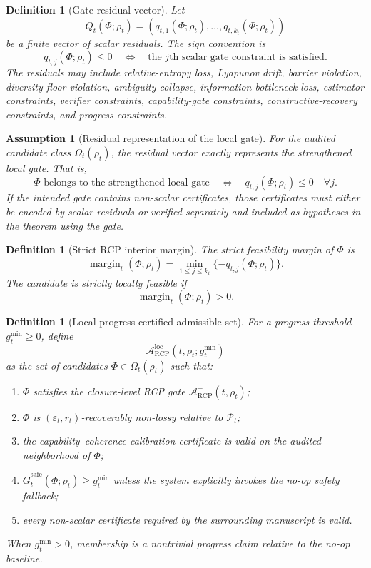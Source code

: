 \documentclass[11pt]{article}
\newtheorem{definition}[theorem]{Definition}
\newtheorem{assumption}[theorem]{Assumption}
\newcommand{\Acal}{\mathcal{A}}
\newcommand{\Pcal}{\mathcal{P}}
\newcommand{\1}{\mathbf{1}}
\newcommand{\eps}{\varepsilon}
\newcommand{\RCP}{\mathrm{RCP}}
\newcommand{\safe}{\mathrm{safe}}
\newcommand{\margin}{\operatorname{margin}}
\begin{document}
\begin{definition}[Gate residual vector]
Let
\[
Q_t(\Phi;\rho_t)=(q_{t,1}(\Phi;\rho_t),\dots,q_{t,k_t}(\Phi;\rho_t))
\]
be a finite vector of scalar residuals.  The sign convention is
\[
q_{t,j}(\Phi;\rho_t)\le0
\quad\Longleftrightarrow\quad
\text{the }j\text{th scalar gate constraint is satisfied.}
\]
The residuals may include relative-entropy loss, Lyapunov drift, barrier violation, diversity-floor violation, ambiguity collapse, information-bottleneck loss, estimator constraints, verifier constraints, capability-gate constraints, constructive-recovery constraints, and progress constraints.
\end{definition}

\begin{assumption}[Residual representation of the local gate]
\label{ass:residual_representation_gate}
For the audited candidate class \(\Omega_t(\rho_t)\), the residual vector exactly represents the strengthened local gate.  That is,
\[
\Phi\text{ belongs to the strengthened local gate}
\quad\Longleftrightarrow\quad
q_{t,j}(\Phi;\rho_t)\le0
\quad\forall j.
\]
If the intended gate contains non-scalar certificates, those certificates must either be encoded by scalar residuals or verified separately and included as hypotheses in the theorem using the gate.
\end{assumption}

\begin{definition}[Strict RCP interior margin]
The strict feasibility margin of \(\Phi\) is
\[
\margin_t(\Phi;\rho_t)
=
\min_{1\le j\le k_t}\{-q_{t,j}(\Phi;\rho_t)\}.
\]
The candidate is strictly locally feasible if
\[
\margin_t(\Phi;\rho_t)>0.
\]
\end{definition}

\begin{definition}[Local progress-certified admissible set]
For a progress threshold \(g_t^{\min}\ge0\), define
\[
\Acal_{\RCP}^{\mathrm{loc}}(t,\rho_t;g_t^{\min})
\]
as the set of candidates \(\Phi\in\Omega_t(\rho_t)\) such that:
\begin{enumerate}[label=(\alph*)]
    \item \(\Phi\) satisfies the closure-level RCP gate \(\Acal_{\RCP}^{+}(t,\rho_t)\);
    \item \(\Phi\) is \((\eps_t,r_t)\)-recoverably non-lossy relative to \(\Pcal_t\);
    \item the capability--coherence calibration certificate is valid on the audited neighborhood of \(\Phi\);
    \item \(\overline G_t^{\safe}(\Phi;\rho_t)\ge g_t^{\min}\) unless the system explicitly invokes the no-op safety fallback;
    \item every non-scalar certificate required by the surrounding manuscript is valid.
\end{enumerate}
When \(g_t^{\min}>0\), membership is a nontrivial progress claim relative to the no-op baseline.
\end{definition}
\end{document}
